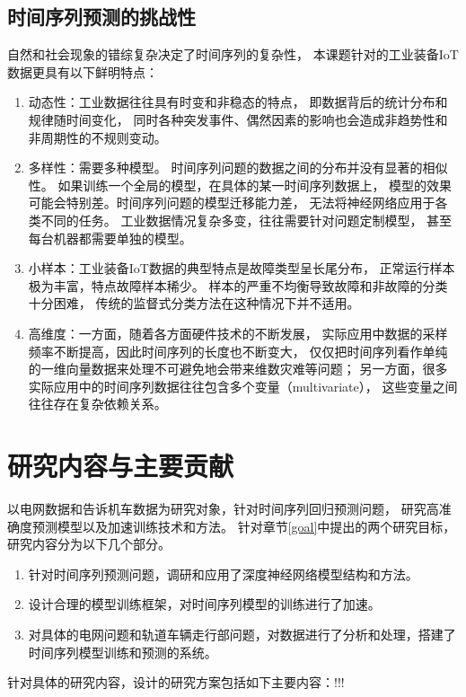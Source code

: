   \subsection{时间序列预测的挑战性}
    自然和社会现象的错综复杂决定了时间序列的复杂性，
    本课题针对的工业装备IoT数据更具有以下鲜明特点：
    \begin{enumerate}[(1)]
      \item 动态性：工业数据往往具有时变和非稳态的特点，
      即数据背后的统计分布和规律随时间变化，
      同时各种突发事件、偶然因素的影响也会造成非趋势性和非周期性的不规则变动。
      \item 多样性：需要多种模型。
      时间序列问题的数据之间的分布并没有显著的相似性。
      如果训练一个全局的模型，在具体的某一时间序列数据上，
      模型的效果可能会特别差。时间序列问题的模型迁移能力差，
      无法将神经网络应用于各类不同的任务。
      工业数据情况复杂多变，往往需要针对问题定制模型，
      甚至每台机器都需要单独的模型。
      \item 小样本：工业装备IoT数据的典型特点是故障类型呈长尾分布，
      正常运行样本极为丰富，特点故障样本稀少。
      样本的严重不均衡导致故障和非故障的分类十分困难，
      传统的监督式分类方法在这种情况下并不适用。
      \item 高维度：一方面，随着各方面硬件技术的不断发展，
      实际应用中数据的采样频率不断提高，因此时间序列的长度也不断变大，
      仅仅把时间序列看作单纯的一维向量数据来处理不可避免地会带来维数灾难等问题；
      另一方面，很多实际应用中的时间序列数据往往包含多个变量（multivariate），
      这些变量之间往往存在复杂依赖关系。
    \end{enumerate}

\section{研究内容与主要贡献}
以电网数据和告诉机车数据为研究对象，针对时间序列回归预测问题，
研究高准确度预测模型以及加速训练技术和方法。
针对章节\ref{goal}中提出的两个研究目标，研究内容分为以下几个部分。
\begin{enumerate}[(1)]
  \item 针对时间序列预测问题，调研和应用了深度神经网络模型结构和方法。
  \item 设计合理的模型训练框架，对时间序列模型的训练进行了加速。
  \item 对具体的电网问题和轨道车辆走行部问题，对数据进行了分析和处理，搭建了时间序列模型训练和预测的系统。
\end{enumerate}

针对具体的研究内容，设计的研究方案包括如下主要内容：!!!

